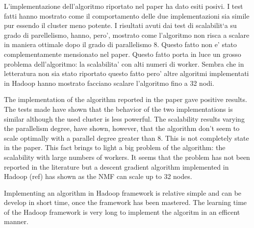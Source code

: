 L'implementazione dell'algoritmo riportato nel paper ha dato esiti posivi. I test fatti hanno mostrato come il comportamento delle due implementazioni sia simile pur essendo il cluster  meno potente. I risultati avuti dai test di scalabilit`a su grado di parellelismo, hanno,  pero',   mostrato come l'algoritmo non risca a scalare in maniera ottimale dopo il grado di parallelismo 8. Questo fatto non e' stato complementamente mensionato nel paper. Questo fatto porta in luce un grosso problema dell'algoritmo: la scalabilita' con alti numeri di worker. Sembra che in letteratura non sia stato riportato questo fatto pero' altre algoritmi implementati in Hadoop hanno mostrato facciano scalare l'algoritmo fino a 32 nodi. 





The implementation of the algorithm reported in the paper gave positive results. The tests made have shown that the behavior of the two implementations is similar although the used cluster is less powerful. The scalability results varying the parallelism degree, have shown, however, that the algorithm don't seem to scale optimally with a parallel degree greater than 8. This is not completely state in the paper. This fact brings to light a big problem of the algorithm: the scalability with large numbers of workers. It seems that the problem has not been reported in the literature but a descent gradient algorithm implemented in Hadoop (ref) has shown as the NMF can scale up to 32 nodes.


Implementing an algorithm in Hadoop framework is relative simple and can be develop in short time, once the framework has been mastered. The learning time of the Hadoop framework is very long to implement the algoritm in an efficent manner.